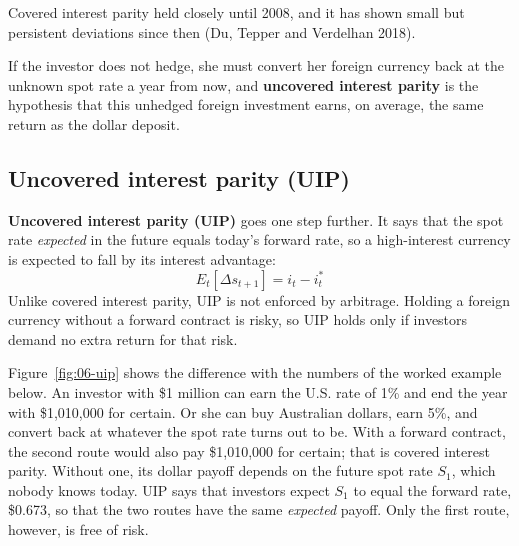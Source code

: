 Covered interest parity held closely until 2008, and it has shown small but persistent deviations since then (Du, Tepper and Verdelhan 2018).

If the investor does not hedge, she must convert her foreign currency back at the unknown spot rate a year from now, and \textbf{uncovered interest parity} is the hypothesis that this unhedged foreign investment earns, on average, the same return as the dollar deposit.

\subsection{Uncovered interest parity (UIP)}

\textbf{Uncovered interest parity (UIP)} goes one step further. It says that the spot rate \emph{expected} in the future equals today's forward rate, so a high-interest currency is expected to fall by its interest advantage:
\begin{equation}
  E_t[\Delta s_{t+1}] = i_t - i^*_t
  \label{eq:06-uip}
\end{equation}
Unlike covered interest parity, UIP is not enforced by arbitrage. Holding a foreign currency without a forward contract is risky, so UIP holds only if investors demand no extra return for that risk.

Figure~\ref{fig:06-uip} shows the difference with the numbers of the worked example below. An investor with \$1 million can earn the U.S. rate of 1\% and end the year with \$1,010,000 for certain. Or she can buy Australian dollars, earn 5\%, and convert back at whatever the spot rate turns out to be. With a forward contract, the second route would also pay \$1,010,000 for certain; that is covered interest parity. Without one, its dollar payoff depends on the future spot rate $S_1$, which nobody knows today. UIP says that investors expect $S_1$ to equal the forward rate, \$0.673, so that the two routes have the same \emph{expected} payoff. Only the first route, however, is free of risk.


